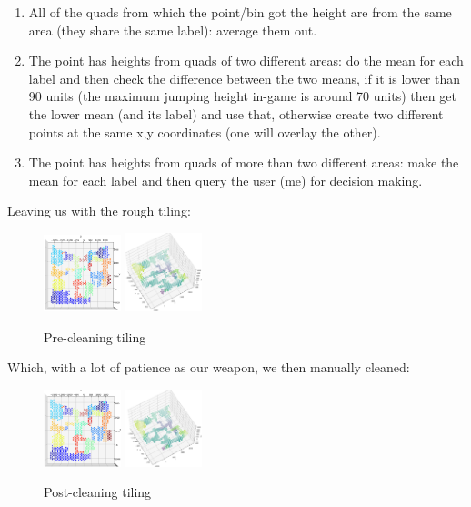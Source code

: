 \documentclass[9pt, a4paper]{IEEEtran}
\begin{document}
    \begin{enumerate}
        \item All of the quads from which the point/bin got the height are from the same area (they share the same label): average them out.
        \item The point has heights from quads of two different areas: do the mean for each label and then check the difference between the two means, if it is lower than 90 units (the maximum jumping height in-game is around 70 units) then get the lower mean (and its label) and use that, otherwise create two different points at the same x,y coordinates (one will overlay the other).
        \item The point has heights from quads of more than two different areas: make the mean for each label and then query the user (me) for decision making.
    \end{enumerate}

    \newpage

    Leaving us with the rough tiling:
    
    \begin{figure}[h]
        \caption{Pre-cleaning tiling}
        \centering
        \includegraphics[width=0.2\textwidth]{images/orig_tiling1.png}
        \includegraphics[width=0.2\textwidth]{images/orig_tiling2.png}
    \end{figure}

    Which, with a lot of patience as our weapon, we then manually cleaned:

    \begin{figure}[h]
        \caption{Post-cleaning tiling}
        \centering
        \includegraphics[width=0.2\textwidth]{images/post_tiling1.png}
        \includegraphics[width=0.2\textwidth]{images/post_tiling2.png}
    \end{figure}
\end{document}
